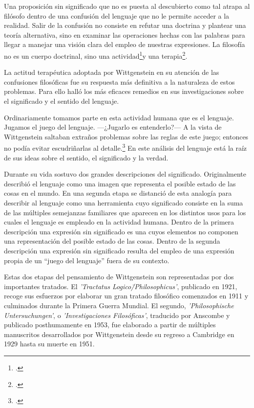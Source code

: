 Una proposición sin significado que no es puesta al descubierto como tal atrapa
al filósofo dentro de una confusión del lenguaje que no le permite acceder a la
realidad. Salir de la confusión no consiste en refutar una doctrina y plantear
una teoría alternativa, sino en examinar las operaciones hechas con las palabras
para llegar a manejar una visión clara del empleo de nuestras expresiones. La
filosofía no es un cuerpo doctrinal, sino una
actividad\footcite[cf.~][4.112]{tractatus}y una
terapia\footcite[cf.~][\S133]{PI}.

La actitud terapéutica adoptada por Wittgenstein en su atención de las
confusiones filosóficas fue su respuesta más definitiva a la naturaleza de estos
problemas. Para ello halló los más eficaces remedios en sus investigaciones
sobre el significado y el sentido del lenguaje.

Ordinariamente tomamos parte en esta actividad humana que es el lenguaje.
Jugamos el juego del lenguaje. ---¿Jugarlo es entenderlo?--- A la vista de
Wittgenstein saltaban extraños problemas sobre las reglas de este juego;
entonces no podía evitar escudriñarlas al
detalle.\footcite[cf.~][loc.7099]{monk} En este análisis del lenguaje está la
raíz de sus ideas sobre el sentido, el significado y la verdad.

Durante su vida sostuvo dos grandes descripciones del significado. Originalmente
describió el lenguaje como una imagen que representa el posible estado de las
cosas en el mundo. En una segunda etapa se distanció de esta analogía para
describir al lenguaje como una herramienta cuyo significado consiste en la suma
de las múltiples semejanzas familiares que aparecen en los distintos usos para
los cuales el lenguaje es empleado en la actividad humana. Dentro de la primera
descripción una expresión sin significado es una cuyos elementos no componen una
representación del posible estado de las cosas. Dentro de la segunda descripción
una expresión sin significado resulta del empleo de una expresión propia de un
``juego del lenguaje'' fuera de su contexto.

Estas dos etapas del pensamiento de Wittgenstein son representadas por dos
importantes tratados. El \emph{'Tractatus Logico\=/Philosophicus'}, publicado en
1921, recoge sus esfuerzos por elaborar un gran tratado filosófico comenzados en
1911 y culminados durante la Primera Guerra Mundial. El segundo,
\emph{'Philosophische Untersuchungen'}, o \emph{'Investigaciones Filosóficas'},
traducido por Anscombe y publicado posthumamente en 1953, fue elaborado a partir
de múltiples manuscritos desarrollados por Wittgenstein desde su regreso a
Cambridge en 1929 hasta su muerte en 1951.

